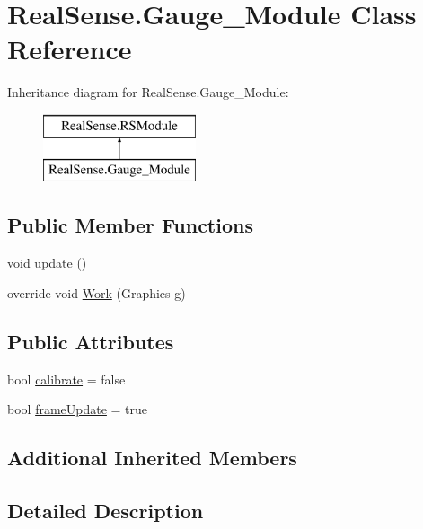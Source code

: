 \hypertarget{class_real_sense_1_1_gauge___module}{}\section{Real\+Sense.\+Gauge\+\_\+\+Module Class Reference}
\label{class_real_sense_1_1_gauge___module}
Inheritance diagram for Real\+Sense.\+Gauge\+\_\+\+Module\+:\begin{figure}[H]
\begin{center}
\leavevmode
\includegraphics[height=2.000000cm]{class_real_sense_1_1_gauge___module}
\end{center}
\end{figure}
\subsection*{Public Member Functions}
\begin{DoxyCompactItemize}
\item 
void \hyperlink{class_real_sense_1_1_gauge___module_a8926962f5dacf753daa21b81da50d176}{update} ()
\item 
override void \hyperlink{class_real_sense_1_1_gauge___module_a587ea68ad539f2f56bcfbd7641a92a83}{Work} (Graphics g)
\end{DoxyCompactItemize}
\subsection*{Public Attributes}
\begin{DoxyCompactItemize}
\item 
bool \hyperlink{class_real_sense_1_1_gauge___module_a116882e1610b28a8ce6159b1ddbbf578}{calibrate} = false
\item 
bool \hyperlink{class_real_sense_1_1_gauge___module_ae9d8d183234958600957fdfd23c4d850}{frame\+Update} = true
\end{DoxyCompactItemize}
\subsection*{Additional Inherited Members}


\subsection{Detailed Description}


